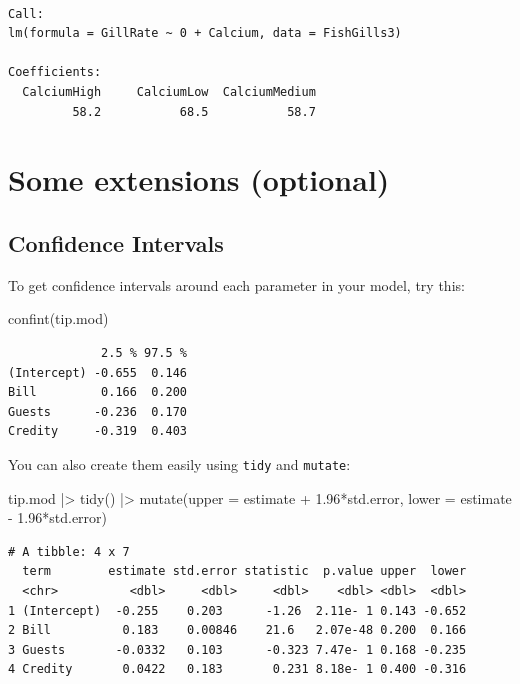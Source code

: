 \documentclass[
  letterpaper,
  DIV=11,
  numbers=noendperiod]{scrreprt}
\newenvironment{Shaded}{\begin{snugshade}}{\end{snugshade}}
\newcommand{\AttributeTok}[1]{\textcolor[rgb]{0.49,0.56,0.16}{#1}}
\newcommand{\FloatTok}[1]{\textcolor[rgb]{0.25,0.63,0.44}{#1}}
\newcommand{\FunctionTok}[1]{\textcolor[rgb]{0.02,0.16,0.49}{#1}}
\newcommand{\NormalTok}[1]{\textcolor[rgb]{0.00,0.44,0.13}{#1}}
\newcommand{\SpecialCharTok}[1]{\textcolor[rgb]{0.25,0.44,0.63}{#1}}
\begin{document}
\begin{verbatim}

Call:
lm(formula = GillRate ~ 0 + Calcium, data = FishGills3)

Coefficients:
  CalciumHigh     CalciumLow  CalciumMedium  
         58.2           68.5           58.7  
\end{verbatim}

\hypertarget{some-extensions-optional}{%
\section{Some extensions (optional)}\label{some-extensions-optional}}

\hypertarget{confidence-intervals}{%
\subsection{Confidence Intervals}\label{confidence-intervals}}

To get confidence intervals around each parameter in your model, try
this:

\begin{Shaded}
\begin{Highlighting}[]
\FunctionTok{confint}\NormalTok{(tip.mod)}
\end{Highlighting}
\end{Shaded}

\begin{verbatim}
             2.5 % 97.5 %
(Intercept) -0.655  0.146
Bill         0.166  0.200
Guests      -0.236  0.170
Credity     -0.319  0.403
\end{verbatim}

You can also create them easily using \texttt{tidy} and \texttt{mutate}:

\begin{Shaded}
\begin{Highlighting}[]
\NormalTok{tip.mod }\SpecialCharTok{|\textgreater{}} 
  \FunctionTok{tidy}\NormalTok{() }\SpecialCharTok{|\textgreater{}} 
  \FunctionTok{mutate}\NormalTok{(}\AttributeTok{upper =}\NormalTok{ estimate }\SpecialCharTok{+} \FloatTok{1.96}\SpecialCharTok{*}\NormalTok{std.error,}
         \AttributeTok{lower =}\NormalTok{ estimate }\SpecialCharTok{{-}} \FloatTok{1.96}\SpecialCharTok{*}\NormalTok{std.error)}
\end{Highlighting}
\end{Shaded}

\begin{verbatim}
# A tibble: 4 x 7
  term        estimate std.error statistic  p.value upper  lower
  <chr>          <dbl>     <dbl>     <dbl>    <dbl> <dbl>  <dbl>
1 (Intercept)  -0.255    0.203      -1.26  2.11e- 1 0.143 -0.652
2 Bill          0.183    0.00846    21.6   2.07e-48 0.200  0.166
3 Guests       -0.0332   0.103      -0.323 7.47e- 1 0.168 -0.235
4 Credity       0.0422   0.183       0.231 8.18e- 1 0.400 -0.316
\end{verbatim}
\end{document}
